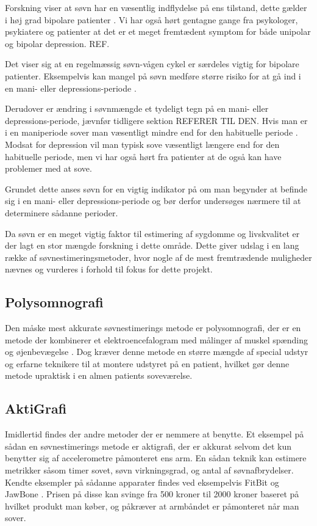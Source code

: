 Forskning viser at søvn har en væsentlig indflydelse på ens tilstand, dette gælder i høj grad bipolare patienter \citep{CPSP:CPSP1164}.
Vi har også hørt gentagne gange fra psykologer, psykiatere og patienter at det er et meget fremtædent symptom for både unipolar og bipolar depression. REF.

Det viser sig at en regelmæssig søvn-vågen cykel er særdeles vigtig for bipolare patienter.
Eksempelvis kan mangel på søvn medføre større risiko for at gå ind i en mani- eller depressions-periode \citep{CPSP:CPSP1164}.

Derudover er ændring i søvnmængde et tydeligt tegn på en mani- eller depressions-periode, jævnfør tidligere sektion REFERER TIL DEN.
Hvis man er i en maniperiode sover man væsentligt mindre end for den habituelle periode \citep{CPSP:CPSP1164}.
Modsat for depression vil man typisk sove væsentligt længere end for den habituelle periode, men vi har også hørt fra patienter at de også kan have problemer med at sove.

Grundet dette anses søvn for en vigtig indikator på om man begynder at befinde sig i en mani- eller depressions-periode og bør derfor undersøges nærmere til at determinere sådanne perioder.

Da søvn er en meget vigtig faktor til estimering af sygdomme og livskvalitet er der lagt en stor mængde forskning i dette område.
Dette giver udslag i en lang række af søvnestimeringsmetoder, hvor nogle af de mest fremtrædende muligheder nævnes og vurderes i forhold til fokus for dette projekt.

\subsection{Polysomnografi}
Den måske mest akkurate søvnestimerings metode er polysomnografi, der er en metode der kombinerer et elektroencefalogram med målinger af muskel spænding og øjenbevægelse \citep{misc:polysomnografi,misc:polysomnography}.
Dog kræver denne metode en større mængde af special udstyr og erfarne teknikere til at montere udstyret på en patient, hvilket gør denne metode upraktisk i en almen patients soveværelse.

\subsection{AktiGrafi}
Imidlertid findes der andre metoder der er nemmere at benytte.
Et eksempel på sådan en søvnestimerings metode er aktigrafi, der er akkurat selvom det kun benytter sig af accelerometre påmonteret ens arm.
En sådan teknik kan estimere metrikker såsom timer sovet, søvn virkningsgrad, og antal af søvnafbrydelser.
Kendte eksempler på sådanne apparater findes ved eksempelvis FitBit og JawBone \citep{misc:fitbitSleepTracking,misc:jawBoneSleepTracking}.
Prisen på disse kan svinge fra 500 kroner til 2000 kroner baseret på hvilket produkt man køber, og påkræver at armbåndet er påmonteret når man sover.


